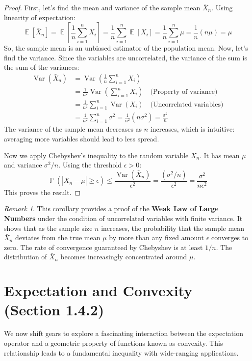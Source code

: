 \documentclass[11pt]{article}
\theoremstyle{definition}
\theoremstyle{remark}
\newtheorem{remark}[theorem]{Remark}
\DeclareMathOperator{\E}{\mathbb{E}} %
\DeclareMathOperator{\Var}{\text{Var}} %
\DeclareMathOperator{\Prob}{\mathbb{P}} %
\begin{document}
\begin{proof}
First, let's find the mean and variance of the sample mean $\bar{X}_n$.
Using linearity of expectation:
\[
\E[\bar{X}_n] = \E\left[\frac{1}{n} \sum_{i=1}^n X_i\right] = \frac{1}{n} \sum_{i=1}^n \E[X_i] = \frac{1}{n} \sum_{i=1}^n \mu = \frac{1}{n} (n\mu) = \mu
\]
So, the sample mean is an unbiased estimator of the population mean.
Now, let's find the variance. Since the variables are uncorrelated, the variance of the sum is the sum of the variances:
\begin{align*} \Var(\bar{X}_n) &= \Var\left(\frac{1}{n} \sum_{i=1}^n X_i\right) \\ &= \frac{1}{n^2} \Var\left(\sum_{i=1}^n X_i\right) \quad \text{(Property of variance)} \\ &= \frac{1}{n^2} \sum_{i=1}^n \Var(X_i) \quad \text{(Uncorrelated variables)} \\ &= \frac{1}{n^2} \sum_{i=1}^n \sigma^2 = \frac{1}{n^2} (n\sigma^2) = \frac{\sigma^2}{n} \end{align*} 
The variance of the sample mean decreases as $n$ increases, which is intuitive: averaging more variables should lead to less spread.

Now we apply Chebyshev's inequality to the random variable $\bar{X}_n$. It has mean $\mu$ and variance $\sigma^2/n$. Using the threshold $\epsilon > 0$:
\[
\Prob(|\bar{X}_n - \mu| \ge \epsilon) \le \frac{\Var(\bar{X}_n)}{\epsilon^2} = \frac{(\sigma^2/n)}{\epsilon^2} = \frac{\sigma^2}{n\epsilon^2}
\]
This proves the result.
\end{proof}

\begin{remark}
This corollary provides a proof of the \textbf{Weak Law of Large Numbers} under the condition of uncorrelated variables with finite variance. It shows that as the sample size $n$ increases, the probability that the sample mean $\bar{X}_n$ deviates from the true mean $\mu$ by more than any fixed amount $\epsilon$ converges to zero. The rate of convergence guaranteed by Chebyshev is at least $1/n$. The distribution of $\bar{X}_n$ becomes increasingly concentrated around $\mu$.
\end{remark}

\section{Expectation and Convexity (Section 1.4.2)}

We now shift gears to explore a fascinating interaction between the expectation operator and a geometric property of functions known as convexity. This relationship leads to a fundamental inequality with wide-ranging applications.
\end{document}
